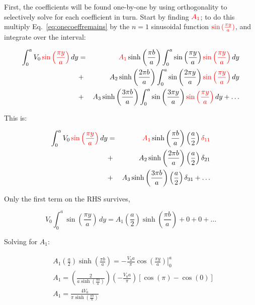 \documentclass[12pt]{article}
\begin{document}
\begin{flushleft}
First, the coefficients will be found one-by-one by using orthogonality to selectively solve for each coefficient in turn.  Start by finding $\textcolor{red} {A_{1}}$; to do this multiply Eq.~\ref{eq:onecoeffremains} by the $n=1$ sinusoidal function $\textcolor{red} {\sin{(\frac{\pi y}{a})}}$, and integrate over the interval:

\begin{eqnarray*}
\int_{0}^{a} V_{0} \, \textcolor{red} {\sin{\left( \frac{\pi y}{a} \right) }} \, dy & =  & \textcolor{red} {A_{1}} \sinh{\left(\frac{\pi b}{a}\right)} \int_{0}^{a} \sin{\left(\frac{\pi y}{a}\right)} \, \textcolor{red} {\sin{\left( \frac{\pi y}{a} \right)}} \, dy \\
& + & A_{2} \sinh{\left(\frac{2\pi b}{a}\right)} \int_{0}^{a} \sin{\left(\frac{2\pi y}{a}\right)} \, \textcolor{red} {\sin{\left( \frac{\pi y}{a} \right) }} \, dy \\
& + & A_{3}\sinh{ \left(\frac{3\pi b}{a}\right) }  \int_{0}^{a} \sin{ \left(\frac{3\pi y}{a}\right) } \, \textcolor{red} {\sin{\left( \frac{\pi y}{a} \right) }} \, dy + \ldots
\end{eqnarray*}

This is:

\begin{eqnarray*}
\int_{0}^{a} V_{0} \, \textcolor{red} {\sin{\left( \frac{\pi y}{a} \right) }} \, dy & =  & \textcolor{red} {A_{1}} \sinh{\left(\frac{\pi b}{a}\right)} \left(\frac{a}{2} \right) \textcolor{red} {\delta_{11}}\\
& + & A_{2} \sinh{\left(\frac{2\pi b}{a}\right)}  \left(\frac{a}{2} \right) \delta_{21}\\
& + & A_{3}\sinh{ \left(\frac{3\pi b}{a}\right) }\left(\frac{a}{2} \right) \delta_{31}   + \ldots
\end{eqnarray*}

Only the first term on the RHS survives,

\begin{equation*}
V_{0} \int_{0}^{a} \sin{\left( \frac{\pi y}{a} \right) } \, dy =  A_{1} \left( \frac{a}{2} \right) \sinh{\left(\frac{\pi b}{a}\right)}  + 0 + 0 + \ldots 
\end{equation*}

Solving for $A_{1}$:

\begin{eqnarray*}
\begin{aligned}
 & A_{1} \left( \frac{a}{2} \right) \sinh{\left(\frac{\pi b}{a}\right)} = - \frac{V_{0}a}{\pi} \left. \cos{\left( \frac{\pi y}{a} \right) } \right\vert_{0}^{a}\\[6pt]
 &  A_{1}  =  \left( \frac{2}{ a\sinh{\left(\frac{\pi b}{a}\right)} }  \right) \left( - \frac{V_{0}a}{\pi} \right) \left[ \cos{(\pi)} - \cos{(0)} \right] \\[6pt]
& A_{1} = \frac{4V_{0}}{\pi \sinh{\left( \frac{\pi b}{a} \right)}}
\end{aligned}
\end{eqnarray*}


\end{flushleft}
\end{document}
